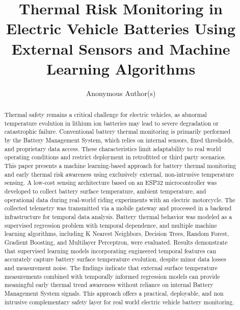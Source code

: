 \documentclass[runningheads]{llncs}
\begin{document}
\title{Thermal Risk Monitoring in Electric Vehicle Batteries Using External Sensors and Machine Learning Algorithms}

\author{Anonymous Author(s)}

\maketitle

\begin{abstract}
Thermal safety remains a critical challenge for electric vehicles, as abnormal temperature evolution in lithium ion batteries may lead to severe degradation or catastrophic failure. Conventional battery thermal monitoring is primarily performed by the Battery Management System, which relies on internal sensors, fixed thresholds, and proprietary data access. These characteristics limit adaptability to real world operating conditions and restrict deployment in retrofitted or third party scenarios. This paper presents a machine learning-based approach for battery thermal monitoring and early thermal risk awareness using exclusively external, non-intrusive temperature sensing. A low-cost sensing architecture based on an ESP32 microcontroller was developed to collect battery surface temperature, ambient temperature, and operational data during real-world riding experiments with an electric motorcycle. The collected telemetry was transmitted via a mobile gateway and processed in a backend infrastructure for temporal data analysis. Battery thermal behavior was modeled as a supervised regression problem with temporal dependence, and multiple machine learning algorithms, including K Nearest Neighbors, Decision Trees, Random Forest, Gradient Boosting, and Multilayer Perceptron, were evaluated. Results demonstrate that supervised learning models incorporating engineered temporal features can accurately capture battery surface temperature evolution, despite minor data losses and measurement noise. The findings indicate that external surface temperature measurements combined with temporally informed regression models can provide meaningful early thermal trend awareness without reliance on internal Battery Management System signals. This approach offers a practical, deployable, and non intrusive complementary safety layer for real world electric vehicle battery monitoring.

\end{abstract}
\end{document}
